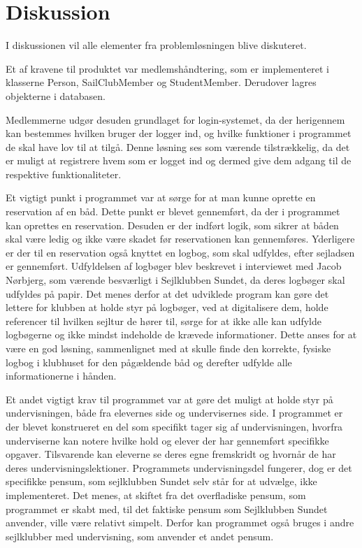 \chapter{Diskussion}

I diskussionen vil alle elementer fra problemløsningen blive diskuteret. 

Et af kravene til produktet var medlemshåndtering, som er implementeret i klasserne Person, SailClubMember og StudentMember. 
Derudover lagres objekterne i databasen. 

Medlemmerne udgør desuden grundlaget for login-systemet, da der herigennem kan bestemmes hvilken bruger der logger ind, og hvilke funktioner i programmet de skal have lov til at tilgå.  
Denne løsning ses som værende tilstrækkelig, da det er muligt at registrere hvem som er logget ind og dermed give dem adgang til de respektive funktionaliteter. 

Et vigtigt punkt i programmet var at sørge for at man kunne oprette en reservation af en båd. 
Dette punkt er blevet gennemført, da der i programmet kan oprettes en reservation. 
Desuden er der indført logik, som sikrer at båden skal være ledig og ikke være skadet før reservationen kan gennemføres. 
Yderligere er der til en reservation også knyttet en logbog, som skal udfyldes, efter sejladsen er gennemført. 
Udfyldelsen af logbøger blev beskrevet i interviewet med Jacob Nørbjerg, som værende besværligt i Sejlklubben Sundet, da deres logbøger skal udfyldes på papir. 
Det menes derfor at det udviklede program kan gøre det lettere for klubben at holde styr på logbøger, ved at digitalisere dem, holde referencer til hvilken sejltur de hører til, sørge for at ikke alle kan udfylde logbøgerne og ikke mindst indeholde de krævede informationer. 
Dette anses for at være en god løsning, sammenlignet med at skulle finde den korrekte, fysiske logbog i klubhuset for den pågældende båd og derefter udfylde alle informationerne i hånden. 

Et andet vigtigt krav til programmet var at gøre det muligt at holde styr på undervisningen, både fra elevernes side og undervisernes side. 
I programmet er der blevet konstrueret en del som specifikt tager sig af undervisningen, hvorfra underviserne kan notere hvilke hold og elever der har gennemført specifikke opgaver.
Tilsvarende kan eleverne se deres egne fremskridt og hvornår de har deres undervisningslektioner.
Programmets undervisningsdel fungerer, dog er det specifikke pensum, som sejlklubben Sundet selv står for at udvælge, ikke implementeret. 
Det menes, at skiftet fra det overfladiske pensum, som programmet er skabt med, til det faktiske pensum som Sejlklubben Sundet anvender, ville være relativt simpelt. 
Derfor kan programmet også bruges i andre sejlklubber med undervisning, som anvender et andet pensum.

